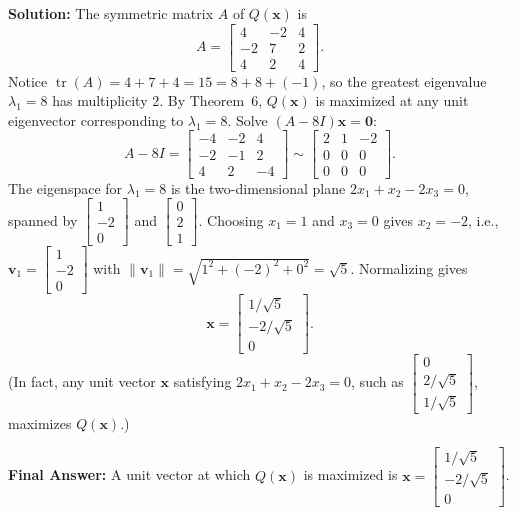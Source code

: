 \documentclass[11pt, letterpaper]{article}
\theoremstyle{definition}
\theoremstyle{remark}
\begin{document}
\textbf{Solution:}
The symmetric matrix $A$ of $Q(\mathbf{x})$ is
\[
A = \begin{bmatrix} 4 & -2 & 4 \\ -2 & 7 & 2 \\ 4 & 2 & 4 \end{bmatrix}.
\]
Notice $\operatorname{tr}(A) = 4 + 7 + 4 = 15 = 8 + 8 + (-1)$, so the greatest eigenvalue $\lambda_1 = 8$ has multiplicity $2$. By Theorem~6, $Q(\mathbf{x})$ is maximized at any unit eigenvector corresponding to $\lambda_1 = 8$. Solve $(A - 8I)\mathbf{x} = \mathbf{0}$:
\[
A - 8I = \begin{bmatrix} -4 & -2 & 4 \\ -2 & -1 & 2 \\ 4 & 2 & -4 \end{bmatrix} \sim \begin{bmatrix} 2 & 1 & -2 \\ 0 & 0 & 0 \\ 0 & 0 & 0 \end{bmatrix}.
\]
The eigenspace for $\lambda_1 = 8$ is the two-dimensional plane $2x_1 + x_2 - 2x_3 = 0$, spanned by $\begin{bmatrix} 1 \\ -2 \\ 0 \end{bmatrix}$ and $\begin{bmatrix} 0 \\ 2 \\ 1 \end{bmatrix}$. Choosing $x_1 = 1$ and $x_3 = 0$ gives $x_2 = -2$, i.e., $\mathbf{v}_1 = \begin{bmatrix} 1 \\ -2 \\ 0 \end{bmatrix}$ with $\|\mathbf{v}_1\| = \sqrt{1^2 + (-2)^2 + 0^2} = \sqrt{5}$. Normalizing gives
\[
\mathbf{x} = \begin{bmatrix} 1/\sqrt{5} \\ -2/\sqrt{5} \\ 0 \end{bmatrix}.
\]
(In fact, any unit vector $\mathbf{x}$ satisfying $2x_1 + x_2 - 2x_3 = 0$, such as $\begin{bmatrix} 0 \\ 2/\sqrt{5} \\ 1/\sqrt{5} \end{bmatrix}$, maximizes $Q(\mathbf{x})$.)

\textbf{Final Answer:} A unit vector at which $Q(\mathbf{x})$ is maximized is $\mathbf{x} = \begin{bmatrix} 1/\sqrt{5} \\ -2/\sqrt{5} \\ 0 \end{bmatrix}$.
\end{document}
